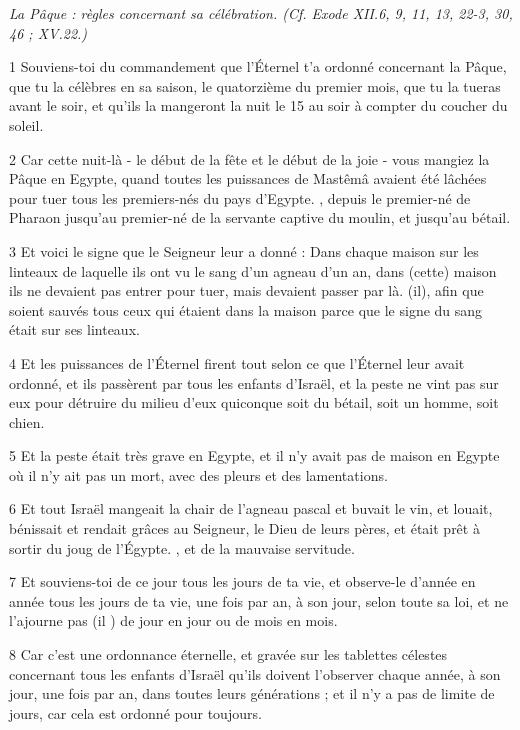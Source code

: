 
\par \textit{La Pâque : règles concernant sa célébration. (Cf. Exode XII.6, 9, 11, 13, 22-3, 30, 46 ; XV.22.)}

\par 1 Souviens-toi du commandement que l'Éternel t'a ordonné concernant la Pâque, que tu la célèbres en sa saison, le quatorzième du premier mois, que tu la tueras avant le soir, et qu'ils la mangeront la nuit le 15 au soir à compter du coucher du soleil.
\par 2 Car cette nuit-là - le début de la fête et le début de la joie - vous mangiez la Pâque en Egypte, quand toutes les puissances de Mastêmâ avaient été lâchées pour tuer tous les premiers-nés du pays d'Egypte. , depuis le premier-né de Pharaon jusqu'au premier-né de la servante captive du moulin, et jusqu'au bétail.
\par 3 Et voici le signe que le Seigneur leur a donné : Dans chaque maison sur les linteaux de laquelle ils ont vu le sang d'un agneau d'un an, dans (cette) maison ils ne devaient pas entrer pour tuer, mais devaient passer par là. (il), afin que soient sauvés tous ceux qui étaient dans la maison parce que le signe du sang était sur ses linteaux.
\par 4 Et les puissances de l'Éternel firent tout selon ce que l'Éternel leur avait ordonné, et ils passèrent par tous les enfants d'Israël, et la peste ne vint pas sur eux pour détruire du milieu d'eux quiconque soit du bétail, soit un homme, soit chien.
\par 5 Et la peste était très grave en Egypte, et il n'y avait pas de maison en Egypte où il n'y ait pas un mort, avec des pleurs et des lamentations.
\par 6 Et tout Israël mangeait la chair de l'agneau pascal et buvait le vin, et louait, bénissait et rendait grâces au Seigneur, le Dieu de leurs pères, et était prêt à sortir du joug de l'Égypte. , et de la mauvaise servitude.
\par 7 Et souviens-toi de ce jour tous les jours de ta vie, et observe-le d'année en année tous les jours de ta vie, une fois par an, à son jour, selon toute sa loi, et ne l'ajourne pas (il ) de jour en jour ou de mois en mois.
\par 8 Car c'est une ordonnance éternelle, et gravée sur les tablettes célestes concernant tous les enfants d'Israël qu'ils doivent l'observer chaque année, à son jour, une fois par an, dans toutes leurs générations ; et il n'y a pas de limite de jours, car cela est ordonné pour toujours.
